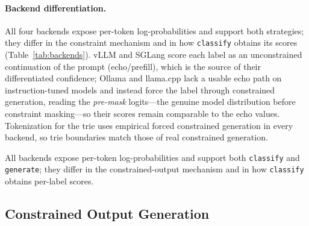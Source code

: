 \documentclass[11pt,a4paper]{article}
\begin{document}
\paragraph{Backend differentiation.}
All four backends expose per-token log-probabilities and support both
strategies; they differ in the constraint mechanism and in how
\texttt{classify} obtains its scores (Table~\ref{tab:backends}). vLLM and
SGLang score each label as an unconstrained continuation of the prompt
(echo/prefill), which is the source of their differentiated confidence;
Ollama and llama.cpp lack a usable echo path on instruction-tuned models and
instead force the label through constrained generation, reading the
\emph{pre-mask} logits---the genuine model distribution before constraint
masking---so their scores remain comparable to the echo values. Tokenization
for the trie uses empirical forced constrained generation in every backend,
so trie boundaries match those of real constrained generation.

\begin{table}[htbp]
  \centering
  \caption{Backend differentiation in \texttt{ollama-classifier} (v0.6.0).}
  \label{tab:backends}
  \footnotesize{All backends expose per-token log-probabilities and support both
          \texttt{classify} and \texttt{generate}; they differ in the
          constrained-output mechanism and in how \texttt{classify} obtains
          per-label scores.}
\end{table}

\subsection{Constrained Output Generation}
\end{document}
